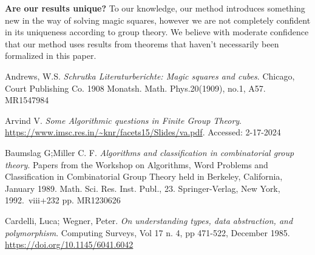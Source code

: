 \documentclass{rhumj_new}
\begin{document}
\textbf{Are our results unique?} To our knowledge, our method introduces something new in the way
of solving magic squares, however we are not completely confident in its uniqueness according to
group theory. We believe with moderate confidence that our method uses results from theorems that
haven't necessarily been formalized in this paper.


\begin{thebibliography}{10}

    Andrews, W.S. {\it Schrutka
    Literaturberichte: Magic squares and cubes}.
    Chicago, Court Publishing Co. 1908
    Monatsh. Math. Phys.20(1909), no.1, A57. 
    MR1547984

    Arvind V.
    {\it Some Algorithmic questions in Finite Group Theory}.
    \url{https://www.imsc.res.in/~knr/facets15/Slides/va.pdf}.
    Accessed: 2-17-2024

    Baumslag G;\@ Miller C. F.
    {\it Algorithms and classification in combinatorial group theory}.
    Papers from the Workshop on Algorithms, Word Problems and Classification in Combinatorial
    Group Theory held in Berkeley, California, January 1989. 
    Math. Sci. Res. Inst. Publ., 23.
    Springer-Verlag, New York, 1992.\ viii+232 pp.
    MR1230626

    Cardelli, Luca; Wegner, Peter.
    {\it On understanding types, data abstraction, and polymorphism}.
    Computing Surveys, Vol 17 n. 4, pp 471-522, December 1985.
    \url{https://doi.org/10.1145/6041.6042}


\end{thebibliography}
\end{document}
